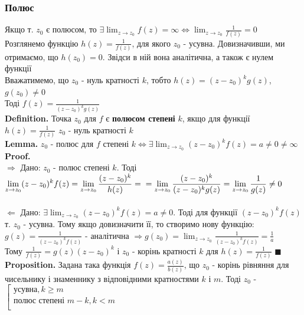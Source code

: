 \documentclass[a4paper, 14pt]{extarticle}
\def\hugespace{\vspace{5mm} \\}
\begin{document}
	 \subsubsection{Полюс}
	 Якщо т. $z_0$ є полюсом, то $\displaystyle\exists \lim_{z \to z_0} f(z) = \infty \iff \lim_{z \to z_0} \frac{1}{f(z)} = 0$\\
	 Розглянемо функцію $h(z) = \displaystyle \frac{1}{f(z)}$, для якого $z_0$ - усувна. Довизначивши, ми отримаємо, що $h(z_0) = 0$. Звідси в ній вона аналітична, а також є нулем функції\\
	 Вважатимемо, що $z_0$ - нуль кратності $k$, тобто $h(z)=(z-z_0)^k g(z)$, $g(z_0) \neq 0$\\
	 Тоді $\displaystyle f(z)=\frac{1}{(z-z_0)^k g(z)}$
	 \hugespace
	 \textbf{Definition.} Точка $z_0$ для $f$ є \textbf{полюсом степені} $k$, якщо для функції $\displaystyle h(z)=\frac{1}{f(z)}$ $z_0$ - нуль кратності $k$
	 \hugespace
	 \textbf{Lemma.} $z_0$ - полюс для $f$ степені $k \iff \exists \displaystyle \lim_{z \to z_0} (z-z_0)^k f(z) = a \neq 0 \neq \infty$
	 \textbf{Proof.}\\
	 $\boxed{\Rightarrow} $ Дано: $z_0$ - полюс степені $k$. Тоді $\displaystyle \lim_{z \to z_0} (z-z_0)^k f(z) = \lim_{z \to z_0} \frac{(z-z_0)^k}{h(z)} = \\ = \lim_{z \to z_0} \frac{(z-z_0)^k}{(z-z_0)^k g(z)} = \lim_{z \to z_0} \frac{1}{g(z)} \neq 0$\\
	 \hugespace
	 $\boxed{\Leftarrow} $ Дано: $\exists \displaystyle \lim_{z \to z_0} (z-z_0)^k f(z) = a \neq 0$. Тоді для функції $(z-z_0)^k f(z)$ т. $z_0$ - усувна. Тому якщо довизначити її, то створимо нову функцію:\\
	 $\displaystyle g(z) = \frac{1}{(z-z_0)^k f(z)}$ - аналітична  $\displaystyle \Rightarrow g(z_0)=\lim_{z \to z_0} \frac{1}{(z-z_0)^k f(z)} = \frac{1}{a}$\\
	 Тому  $\displaystyle\frac{1}{f(z)}=g(z)(z-z_0)^k$ і $z_0$ - корінь кратності $k$ для $h(z)=\displaystyle \frac{1}{f(z)}$ $\blacksquare$
	 \hugespace
	 \textbf{Proposition.} Задана така функція $\displaystyle f(z)=\frac{a(z)}{b(z)}$, що $z_0$ - корінь рівняння для чисельнику і знаменнику з відповідними кратностями $k$ і $m$. Тоді $z_0$ - $\left[
  \begin{array}{ccc}
     \textrm{усувна}, k \geq m \\
     \textrm{полюс степені  } m-k, k < m \\
  \end{array}
\right.$\\
\end{document}
